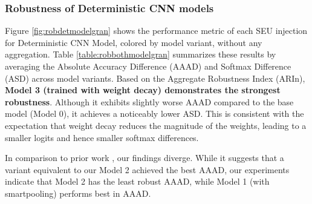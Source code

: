 \documentclass[ %
                    author={Revalda Putawara},
                supervisor={Dr. James Pope},
                    degree={MSc},
                     title={Robustness of Bayesian Neural Networks Design Choices Against Weight and Bias Perturbation Induced by Single Event Upsets (SEUs)},
                      type={},
                      year={2025}]{dissertation}
\begin{document}
\subsubsection{Robustness of Deterministic CNN models}


Figure \ref{fig:robdetmodelgran} shows the performance metric of each SEU injection for Deterministic CNN Model, colored by model variant, without any aggregation. Table \ref{table:robbothmodelgran} summarizes these results by averaging the Absolute Accuracy Difference (AAAD) and Softmax Difference (ASD) across model variants. Based on the Aggregate Robustness Index (ARIn), \textbf{Model 3 (trained with weight decay) demonstrates the strongest robustness}. Although it exhibits slightly worse AAAD compared to the base model (Model 0), it achieves a noticeably lower ASD. This is consistent with the expectation that weight decay reduces the magnitude of the weights, leading to a smaller logits and hence smaller softmax differences.

In comparison to prior work \cite{dennispoperobustcnn}, our findings diverge. While it suggests that a variant equivalent to our Model 2 achieved the best AAAD, our experiments indicate that Model 2 has the least robust AAAD, while Model 1 (with smartpooling) performs best in AAAD. 
\end{document}
